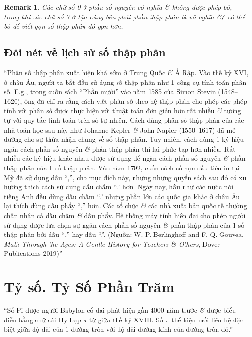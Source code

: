 \documentclass[oneside]{book}
\numberwithin{equation}{section}
\newtheorem{remark}{Remark}[section]
\begin{document}
\begin{remark}
	Các chữ số 0 ở phần số nguyên có nghĩa \textit{\&} không được phép bỏ, trong khi các chữ số 0 ở tận cùng bên phải phần thập phân là vô nghĩa \&\emph{\texttt{/}} có thể bỏ để viết gọn số thập phân đó gọn hơn.
\end{remark}

\subsection{Đôi nét về lịch sử số thập phân}
``Phân số thập phân xuất hiện khá sớm ở Trung Quốc \textit{\&} Ả Rập. Vào thế kỷ XVI, ở châu Âu, người ta bắt đầu sử dụng số thập phân như 1 công cụ tính toán phân số. E.g., trong cuốn sách ``Phần mười'' vào năm 1585 của Simon Stevin (1548--1620), ông đã chỉ ra rằng cách viết phân số theo hệ thập phân cho phép các phép tính với phân số được thực hiện với thuật toán đơn giản hơn rất nhiều \textit{\&} tương tự với quy tắc tính toán trên số tự nhiên. Cách dùng phân số thập phân của các nhà toán học sau này như Johanne Kepler \textit{\&} John Napier (1550--1617) đã mở đường cho sự thừa nhận chung về số thập phân. Tuy nhiên, cách dùng 1 ký hiệu ngăn cách phần số nguyên \textit{\&} phần thập phân thì lại phức tạp hơn nhiều. Rất nhiều các ký hiệu khác nhau được sử dụng để ngăn cách phần số nguyên \textit{\&} phần thập phân của 1 số thập phân. Vào năm 1792, cuốn sách số học đầu tiên in tại Mỹ đã sử dụng dấu ``,'', cho mục đích này, nhưng những quyển sách sau đó có xu hướng thích cách sử dụng dấu chấm ``.'' hơn. Ngày nay, hầu như các nước nói tiếng Anh đều dùng dấu chấm ``.'' nhưng phần lớn các quốc gia khác ở châu Âu lại thích dùng dấu phẩy ``,'' hơn. Các tổ chức \textit{\&} các nhà xuất bản quốc tế thường chấp nhận cả dấu chấm \textit{\&} dấu phẩy. Hệ thống máy tính hiện đại cho phép người sử dụng được lựa chọn sự ngăn cách phần số nguyên \textit{\&} phần thập phân của 1 số thập phân bởi dấu ``,'' hay dấu ``.''. (Nguồn: W. P. Berlinghoff and F. Q. Gouvea, \textit{Math Through the Ages: A Gentle History for Teachers \textit{\&} Others}, Dover Publications 2019)'' -- \cite[p. 60]{Thai_Anh_Dat_Ha_Loan_Nam_Quang_Toan_6_tap_2}


\section{Tỷ số. Tỷ Số Phần Trăm}
``Số Pi được người Babylon cổ đại phát hiện gần 4000 năm trước \textit{\&} được biểu diễn bằng chữ cái Hy Lạp $\pi$ từ giữa thế kỷ XVIII. Số $\pi$ thể hiện mối liên hệ đặc biệt giữa độ dài của 1 đường tròn với độ dài đường kính của đường tròn đó.'' -- \cite[p. 61]{Thai_Anh_Dat_Ha_Loan_Nam_Quang_Toan_6_tap_2}
\end{document}
